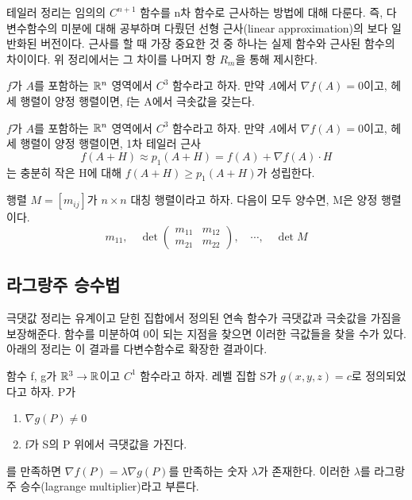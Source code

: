 테일러 정리는 임의의 $C^{n+1}$ 함수를 n차 함수로 근사하는 방법에 대해 다룬다. 즉, 다변수함수의 미분에 대해 공부하며 다뤘던 선형 근사(linear approximation)의 보다 일반화된 버전이다. 근사를 할 때 가장 중요한 것 중 하나는 실제 함수와 근사된 함수의 차이이다. 위 정리에서는 그 차이를 나머지 항 $R_m$을 통해 제시한다.

\begin{theorem}
$f$가 $A$를 포함하는 $\mathbb{R}^n$ 영역에서 $C^3$ 함수라고 하자. 만약 $A$에서 $\nabla f(A)=0$이고, 헤세 행렬이 양정 행렬이면, f는 A에서 극솟값을 갖는다.
\end{theorem}

\begin{theorem}
$f$가 $A$를 포함하는 $\mathbb{R}^n$ 영역에서 $C^3$ 함수라고 하자. 만약 $A$에서 $\nabla f(A)=0$이고, 헤세 행렬이 양정 행렬이면, 1차 테일러 근사
$$
f(A+H) \approx p_1(A+H) = f(A) + \nabla f(A) \cdot H
$$
는 충분히 작은 H에 대해 $f(A+H) \geq p_1(A+H)$가 성립한다.
\end{theorem}

\begin{theorem}
행렬 $M=[m_{ij}]$가 $n \times n$ 대칭 행렬이라고 하자. 다음이 모두 양수면, M은 양정 행렬이다.
$$
m_{11}, \quad \det \begin{pmatrix}
m_{11} & m_{12} \\ m_{21} & m_{22}
\end{pmatrix}, \quad \cdots, \quad \det M
$$
\end{theorem}

\subsection{라그랑주 승수법}
극댓값 정리는 유계이고 닫힌 집합에서 정의된 연속 함수가 극댓값과 극솟값을 가짐을 보장해준다. 함수를 미분하여 0이 되는 지점을 찾으면 이러한 극값들을 찾을 수가 있다. 아래의 정리는 이 결과를 다변수함수로 확장한 결과이다.

\begin{theorem}
함수 f, g가 $\mathbb{R}^3 \to \mathbb{R}$이고 $C^1$ 함수라고 하자. 레벨 집합 S가 $g(x,y,z)=c$로 정의되었다고 하자. P가
\begin{enumerate}[label=(\alph*)]
    \item $\nabla g(P) \neq 0$
    \item f가 S의 P 위에서 극댓값을 가진다.
\end{enumerate}
를 만족하면 $\nabla f(P) = \lambda \nabla g(P)$를 만족하는 숫자 $\lambda$가 존재한다. 이러한 $\lambda$를 라그랑주 승수(lagrange multiplier)라고 부른다.
\end{theorem}
